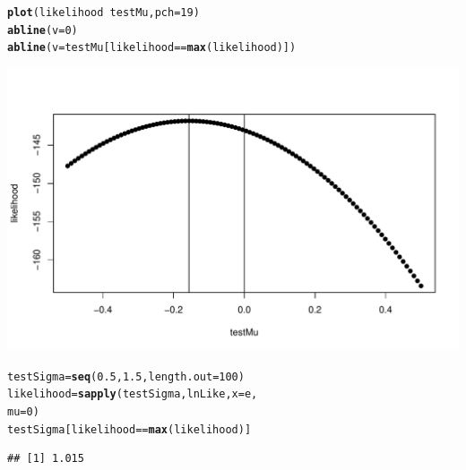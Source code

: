 \documentclass[xcolor=dvipsnames]{beamer}\usepackage{graphicx, color}
\makeatletter
\def\maxwidth{ %
  \ifdim\Gin@nat@width>\linewidth
    \linewidth
  \else
    \Gin@nat@width
  \fi
}
\newcommand{\hlfunctioncall}[1]{\textcolor[rgb]{0.501960784313725,0,0.329411764705882}{\textbf{#1}}}%
\newenvironment{kframe}{%
 \def\at@end@of@kframe{}%
 \ifinner\ifhmode%
  \def\at@end@of@kframe{\end{minipage}}%
  \begin{minipage}{\columnwidth}%
 \fi\fi%
 \def\FrameCommand##1{\hskip\@totalleftmargin \hskip-\fboxsep
 \colorbox{shadecolor}{##1}\hskip-\fboxsep
     \hskip-\linewidth \hskip-\@totalleftmargin \hskip\columnwidth}%
 \MakeFramed {\advance\hsize-\width
   \@totalleftmargin\z@ \linewidth\hsize
   \@setminipage}}%
 {\par\unskip\endMakeFramed%
 \at@end@of@kframe}
\newenvironment{knitrout}{}{} %
\makeatother
\begin{document}
\begin{frame}[fragile]
\begin{knitrout}
\color{fgcolor}\begin{kframe}
\begin{alltt}
\hlfunctioncall{plot}(likelihood ~ testMu, pch = 19)
\hlfunctioncall{abline}(v = 0)
\hlfunctioncall{abline}(v = testMu[likelihood == \hlfunctioncall{max}(likelihood)])
\end{alltt}
\end{kframe}
\includegraphics[width=\maxwidth]{figure/unnamed-chunk-11} 

\end{knitrout}

\end{frame}

\begin{frame}[fragile]
\begin{knitrout}
\color{fgcolor}\begin{kframe}
\begin{alltt}
testSigma = \hlfunctioncall{seq}(0.5, 1.5, length.out = 100)
likelihood = \hlfunctioncall{sapply}(testSigma, lnLike, x = e, 
    mu = 0)
testSigma[likelihood == \hlfunctioncall{max}(likelihood)]
\end{alltt}
\begin{verbatim}
## [1] 1.015
\end{verbatim}
\end{kframe}
\end{knitrout}

\end{frame}
\end{document}
